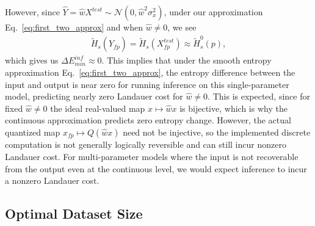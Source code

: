 \documentclass[12pt,onecolumn, margin=1in]{IEEEtran}
\newcommand{\paren}[1]{\left( #1 \right)}
\newcommand{\gauss}[2]{\mathcal{N}\paren{#1, #2}}
\newcommand{\wh}{\hat{w}}
\newcommand{\sigx}{\sigma_x}
\newcommand{\Ht}{\tilde{H}}
\newcommand{\Yhfp}{\hat{Y}_{fp}}
\begin{document}
However, since $\hat{Y} = \wh X^{test} \sim \gauss{0}{\wh^2\sigx^2}$, under our approximation Eq.~\eqref{eq:first_two_approx} and when $\wh \neq 0$, we see
\begin{align}
    \tilde H_s(\Yhfp) = \tilde H_s(X_{fp}^{test}) \approx \Ht^0_{s}(p),
\end{align}
which gives us $\Delta E_{min}^{inf} \approx 0$.
This implies that under the smooth entropy approximation Eq.~\eqref{eq:first_two_approx}, the entropy difference between the input and output is near zero for running inference on this single-parameter model, predicting nearly zero Landauer cost for $\wh \neq 0$. This is expected, since for fixed $\wh \neq 0$ the ideal real-valued map $x \mapsto \wh x$ is bijective, which is why the continuous approximation predicts zero entropy change. However, the actual quantized map $x_{fp} \mapsto Q(\wh x)$ need not be injective, so the implemented discrete computation is not generally logically reversible and can still incur nonzero Landauer cost. For multi-parameter models where the input is not recoverable from the output even at the continuous level, we would expect inference to incur a nonzero Landauer cost.



\subsection{Optimal Dataset Size}
\end{document}
